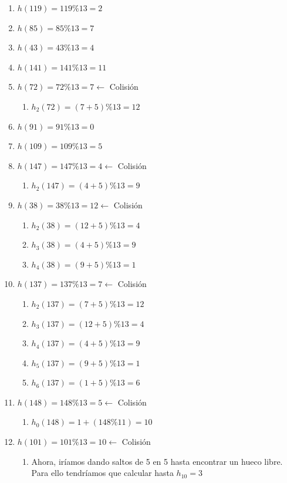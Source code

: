 \documentclass[10pt,a4paper,spanish]{report}
\begin{document}
\begin{minipage}{0.6\textwidth}
\begin{enumerate}
      \item $h(119) = 119 \% 13 = 2$
      \item $h(85) = 85 \% 13 = 7$
      \item $h(43) = 43 \% 13 = 4$
      \item $h(141) = 141 \% 13 = 11$
      \item $h(72) = 72 \% 13 = 7 \longleftarrow$ Colisión
      \begin{enumerate}[$\diamond$]
            \item $h_2 (72) = (7+5) \% 13 = 12$
      \end{enumerate}
      \item $h(91) = 91 \% 13 = 0$
      \item $h(109) = 109 \% 13 = 5$
      \item $h(147) = 147 \% 13 = 4 \longleftarrow$ Colisión
      \begin{enumerate}[$\diamond$]
            \item $h_2 (147) = (4+5) \% 13 = 9$
      \end{enumerate}
      \item $h(38) = 38 \% 13 = 12 \longleftarrow$ Colisión
      \begin{enumerate}[$\diamond$]
            \item $h_2 (38) = (12+5) \% 13 = 4$
            \item $h_3 (38) = (4+5) \% 13 = 9$
            \item $h_4 (38) = (9+5) \%13 = 1$
      \end{enumerate}
      \item $h(137) = 137 \% 13 = 7 \longleftarrow$ Colisión
      \begin{enumerate}
            \item $h_2 (137) = (7+5) \% 13 = 12$
            \item $h_3 (137) = (12+5) \% 13 = 4$
            \item $h_4 (137) = (4+5) \% 13 = 9$
            \item $h_5 (137) = (9+5) \% 13 = 1$
            \item $h_6 (137) = (1+5) \% 13 = 6$
      \end{enumerate}
      \item $h(148) = 148 \% 13 = 5 \longleftarrow$ Colisión
      \begin{enumerate}[$\diamond$]
            \item $h_0 (148) = 1 + (148 \% 11) = 10$
      \end{enumerate}
      \item $h(101) = 101 \% 13 = 10 \longleftarrow$ Colisión
      \begin{enumerate}[$\diamond$]
            \item Ahora, iríamos dando saltos de 5 en 5 hasta encontrar un hueco libre. Para ello tendríamos que calcular hasta $h_{10} = 3$
      \end{enumerate}
\end{enumerate}
\end{minipage}
\end{document}
